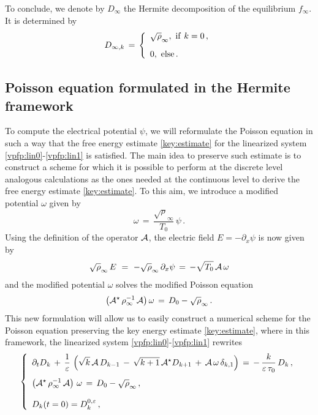 \documentclass[11pt]{amsart}
\numberwithin{equation}{section}
\numberwithin{figure}{section}
\begin{document}
To conclude, we denote by $D_\infty$ the Hermite decomposition of the equilibrium $f_{\infty}$. It is determined by
\begin{equation}
  \label{Dinf}
D_{\infty,k} \,=\,
\left\{
  \begin{array}{l}
    \sqrt\rho_\infty, \,\, {\rm if } \,\, k=0\,,
    \\[0.9em]
    0, \, \, {\rm else\,.}
    \end{array}
  \right.
\end{equation}
\subsection{Poisson equation formulated in the Hermite framework}\label{sec:form:poisson:hermite}
To compute the electrical potential $\psi$, we will reformulate the Poisson equation in such a way
that the free energy estimate \eqref{key:estimate} for the linearized system
\eqref{vpfp:lin0}-\eqref{vpfp:lin1} is satisfied. The main idea to
preserve such estimate is to construct a scheme for which it is possible to perform at the discrete level analogous calculations as the ones needed at the continuous level to derive the free
energy estimate \eqref{key:estimate}.  To this aim, we introduce a
modified potential $\omega$ given by
$$
\omega\,=\,\frac{\sqrt{\rho}_{\infty}}{T_0}\,\psi\,.
$$
Using the definition of the operator ${\mathcal A}$, the electric field
$E=-\partial_x \psi $ is now given by
$$
\sqrt\rho_\infty  \,E \,\,=\,\, -\sqrt\rho_\infty \,\partial_x \psi  \,=\, -\sqrt{T_0} \,{\mathcal A}\, \omega
$$
and the modified potential $\omega$ solves the modified Poisson equation
\begin{equation}
  \label{Hermite:v}
\left({\mathcal A}^\star\,\rho_{\infty}^{-1}\,{\mathcal A}\right) \omega\, =\, D_0-\sqrt{\rho}_{\infty}\,.
\end{equation}
This new formulation will allow us to easily construct a numerical scheme for
the Poisson equation preserving the key energy estimate \eqref{key:estimate}, where in this framework, the linearized system \eqref{vpfp:lin0}-\eqref{vpfp:lin1} rewrites 
\begin{equation}
	\label{Hermite:lin}
	\left\{
	\begin{array}{l}
		\displaystyle\partial_t D_{k} \,+\,
		\frac{1}{\varepsilon}\,\left( \sqrt{k}\,
		{\mathcal A}\,D_{k-1}\,- \, \sqrt{k +1}\,
		{\mathcal A}^\star D_{k+1}\,+\, {\mathcal A}\,  \omega \,\delta_{k,1} 
		\right)  \,  =\,  - \,  \frac{k}{\varepsilon\,\tau_0}\,  D_{k}\,,
		\\[1.2em]
		\displaystyle \left({\mathcal A}^\star\,\rho_{\infty}^{-1}\,{\mathcal A}\right) \,\omega\, =\, D_0-\sqrt{\rho}_{\infty}\,,
		\\[1.2em]
		\displaystyle D_{k}(t=0) =  D^{0,\varepsilon}_{k}\,,
	\end{array}\right.
\end{equation}
\end{document}
